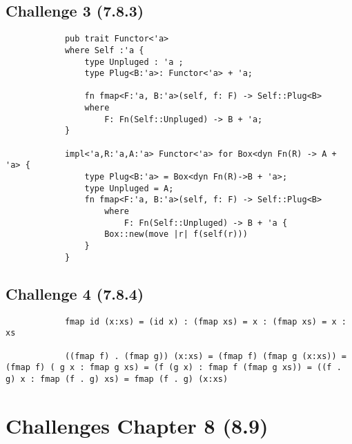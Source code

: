 \documentclass[11pt]{article}
\begin{document}
    \subsection*{Challenge 3 (7.8.3)}
        \begin{verbatim}
            pub trait Functor<'a>
            where Self :'a {
                type Unpluged : 'a ;
                type Plug<B:'a>: Functor<'a> + 'a;

                fn fmap<F:'a, B:'a>(self, f: F) -> Self::Plug<B>
                where
                    F: Fn(Self::Unpluged) -> B + 'a;
            }

            impl<'a,R:'a,A:'a> Functor<'a> for Box<dyn Fn(R) -> A + 'a> {
                type Plug<B:'a> = Box<dyn Fn(R)->B + 'a>;
                type Unpluged = A;
                fn fmap<F:'a, B:'a>(self, f: F) -> Self::Plug<B>
                    where
                        F: Fn(Self::Unpluged) -> B + 'a {
                    Box::new(move |r| f(self(r)))
                }
            }
        \end{verbatim}

    \subsection*{Challenge 4 (7.8.4)}
        \begin{verbatim}
            fmap id (x:xs) = (id x) : (fmap xs) = x : (fmap xs) = x : xs

            ((fmap f) . (fmap g)) (x:xs) = (fmap f) (fmap g (x:xs)) = (fmap f) ( g x : fmap g xs) = (f (g x) : fmap f (fmap g xs)) = ((f . g) x : fmap (f . g) xs) = fmap (f . g) (x:xs)
        \end{verbatim}



\section*{Challenges Chapter 8 (8.9)}
\end{document}
